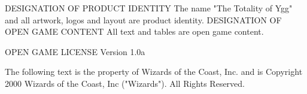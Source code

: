 {



\pagebreak


DESIGNATION OF PRODUCT IDENTITY
The name "The Totality of Ygg" and all artwork, logos and layout are product identity. DESIGNATION OF OPEN GAME CONTENT All text and tables are open game content.

OPEN GAME LICENSE Version 1.0a

The following text is the property of Wizards of the Coast, Inc. and is Copyright 2000 Wizards of the Coast, Inc ("Wizards"). All Rights Reserved.

}
